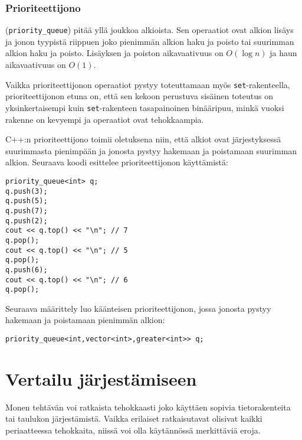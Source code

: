 \subsubsection{Prioriteettijono}


 (\texttt{priority\_queue})
pitää yllä joukkoa alkioista.
Sen operaatiot ovat alkion lisäys ja
jonon tyypistä riippuen joko
pienimmän alkion haku ja poisto tai
suurimman alkion haku ja poisto.
Lisäyksen ja poiston aikavaativuus on $O(\log n)$
ja haun aikavaativuus on $O(1)$.

Vaikka prioriteettijonon operaatiot
pystyy toteuttamaan myös \texttt{set}-ra\-ken\-teel\-la,
prioriteettijonon etuna on,
että sen kekoon perustuva sisäinen
toteutus on yksinkertaisempi
kuin \texttt{set}-rakenteen tasapainoinen binääripuu,
minkä vuoksi rakenne on kevyempi ja
operaatiot ovat tehokkaampia.

\begin{samepage}
C++:n prioriteettijono toimii oletuksena niin,
että alkiot ovat järjestyksessä suurimmasta pienimpään
ja jonosta pystyy hakemaan ja poistamaan suurimman alkion.
Seuraava koodi esittelee prioriteettijonon käyttämistä:

\begin{lstlisting}
priority_queue<int> q;
q.push(3);
q.push(5);
q.push(7);
q.push(2);
cout << q.top() << "\n"; // 7
q.pop();
cout << q.top() << "\n"; // 5
q.pop();
q.push(6);
cout << q.top() << "\n"; // 6
q.pop();
\end{lstlisting}
\end{samepage}

Seuraava määrittely luo käänteisen prioriteettijonon,
jossa jonosta pystyy hakemaan ja poistamaan pienimmän alkion:

\begin{lstlisting}
priority_queue<int,vector<int>,greater<int>> q;
\end{lstlisting}

\section{Vertailu järjestämiseen}

Monen tehtävän voi ratkaista tehokkaasti joko
käyttäen sopivia tietorakenteita
tai taulukon järjestämistä.
Vaikka erilaiset ratkaisutavat olisivat kaikki
periaatteessa tehokkaita, niissä voi olla
käytännössä merkittäviä eroja.

